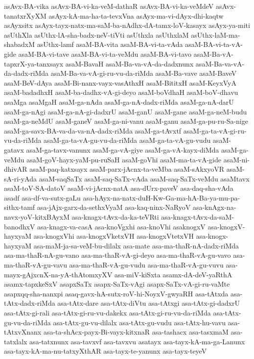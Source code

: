 {asAvx-BA-vika
asAvx-BA-vi-ka-veM-dathaR
asAvx-BA-vi-ka-veMdeV
asAvx-tanatxrXyXM
asAyx-kA-ma-ha-ta-tevxVna
asAyx-ma-vi-dAyx-dhi-kaqtw
asAyxsitx
asAyx-tayx-natx-ma-saM-ba-nAdhx-dA-tamx-loV-kasayx
asAyx-ya-miti
asUthXla
asUthx-lA-sha-badx-neV-tiVti
asUthxla
asUthxlaM
asUthx-laM-ma-shabadxM
asUthx-lamf
asaM-BA-vita
asaM-BA-vi-ta-vAda
asaM-BA-vi-ta-vA-gide
asaM-BA-vi-tave
asaM-BA-vi-ta-veMdu
asaM-BA-vi-tavo
asaM-Ba-vA-tapxrX-ya-tanxsayx
asaM-BavaH
asaM-Ba-va-vA-da-dadxnunx
asaM-Ba-va-vA-da-dadx-riMda
asaM-Ba-va-vA-gi-ru-vu-da-riMda
asaM-Ba-vave
asaM-BaveV
asaM-BeV-dAya
asaM-Bi-nanx-vayx-vasAthxH
asaM-BititxH
asaM-KeyxVyA
asaM-badadhxH
asaM-ba-dadhx-vA-gi-deyo
asaM-boVdhaH
asaM-boV-dhavu
asaMga
asaMgaH
asaM-ga-nAda
asaM-ga-nA-dadx-riMda
asaM-ga-nA-darU
asaM-ga-nAgi
asaM-ga-nA-gi-dadxrU
asaM-ganU
asaM-gane
asaM-ga-neM-budu
asaM-ga-neMdU
asaM-ganeV
asaM-ga-ni-vanu
asaM-ganu
asaM-ga-pu-ru-Sa-nige
asaM-ga-savx-BA-va-da-va-nA-dadx-riMda
asaM-ga-tAvxtf
asaM-ga-ta-vA-gi-ru-vu-da-riMda
asaM-ga-ta-vA-gu-vu-da-riMda
asaM-ga-ta-vA-gu-vudu
asaM-gatavx
asaM-ga-tavx-vanunx
asaM-ga-vA-giye
asaM-ga-vA-kayx-diMda
asaM-ga-veMdu
asaM-goV-hayx-yaM-pu-ruSaH
asaM-goVhi
asaM-ma-ta-vA-gide
asaM-ni-dhivAR
asaM-paq-katxsayx
asaM-parx-jAcnx-ta-veMba
asaM-sAkxyoVR
asaM-sA-ri-yAda
asaM-saqSaTx
asaM-saq-SaTx-vAda
asaM-saq-SaTx-veMdu
asaMtavx
asaM-toV-SA-datoV
asaM-vi-jAcnx-natA
asa-dUrx-paveV
asa-daq-sha-vAda
asadf
asa-df-va-sutx-gaLu
asa-hAyx-na-natx-duH-Kw-Ga-ma-hA-Ba-ya-mu-pa-sithx-tamf
asa-jAjx-garx-da-sethxVyaM
asa-kaq-ninx-NaRyoV
asa-knAgx-na-navx-yoV-kitxBAyxM
asa-knagx-tAvx-da-ka-teVRti
asa-knagx-tAvx-da-saM-banodhxV
asa-knagx-va-casA
asa-knoVgxhi
asa-knoVhi
asaknogxV
asa-knogxV-hayxyaM
asa-knogxVhi
asa-knogxVketxVH
asa-knogxVtetxVH
asa-knogx-hayxyaM
asa-maM-ja-sa-veM-bu-dilalx
asa-mate
asa-ma-thaR-nA-dadx-riMda
asa-ma-thaR-nA-gu-vano
asa-ma-thaR-vA-gi-deyo
asa-ma-thaR-vA-gu-vavo
asa-ma-thaR-vA-gu-vavu
asa-ma-thaR-vA-gu-vudu
asa-ma-thaR-vA-gu-vuvu
asa-mayx-gAjxcnX-na-yA-thAtomxyXV
asa-miV-kiSxta
asamx-dA-deV-yaRthA
asamx-tapxkeSxV
asapxSaTx
asapx-SaTx-vAgi
asapx-SaTx-vA-gi-ru-vaMte
asapxqq-sha-nanxpi
asaq-gavx-hA-sutx-roV-hi-NoyxV-gwyaRH
asa-tAtxda
asa-tAtx-dadx-riMda
asa-tAtx-dare
asa-tAtx-diVtu
asa-tAtxgi
asa-tAtx-gi-dadxrU
asa-tAtx-gi-rali
asa-tAtx-gi-ru-vu-dakekx
asa-tAtx-gi-ru-vu-da-riMda
asa-tAtx-gu-vu-da-riMda
asa-tAtx-gu-vu-dilalx
asa-tAtx-gu-vudu
asa-tAtx-hu-vavu
asa-tAtxvXnanx
asa-ta-shAcx-payx-Bi-vayx-kitxnaR
asa-tashacx
asa-tasxmaM
asa-tatxlalx
asa-tatxnunx
asa-tavxvf
asa-tavxvu
asatayx
asa-tayx-kA-ma-ga-Lanunx
asa-tayx-kA-ma-nu-tatxyXthAR
asa-tayx-te-yanunx
asa-tayx-teyeV
}
